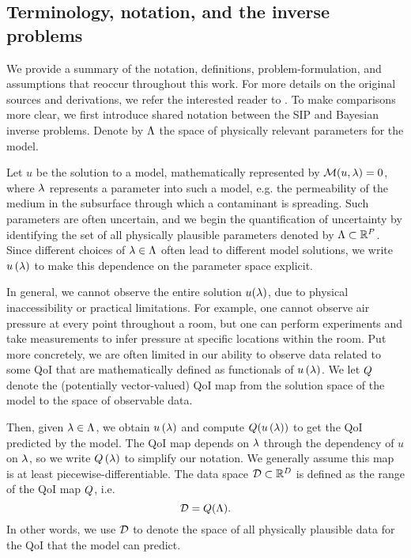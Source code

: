 \subsection{Terminology, notation, and the inverse problems}
We provide a summary of the notation, definitions, problem-formulation, and assumptions that reoccur throughout this work.
For more details on the original sources and derivations,  we refer the interested reader to \cite{BES12, BE13, BET+14, BJW18, BWY20}.
To make comparisons more clear, we first introduce shared notation between the SIP and Bayesian inverse problems.
Denote by ${\Lambda}$ the space of physically relevant parameters for the model.

Let $u$ be the solution to a model, mathematically represented by $\mathcal{M}(u, \lambda) = 0$, where $\lambda$ represents a parameter into such a model, e.g. the permeability of the medium in the subsurface through which a contaminant is spreading.
Such parameters are often uncertain, and we begin the quantification of uncertainty by identifying the set of all physically plausible parameters denoted by ${\Lambda}\subset\mathbb{R}^P$.
Since different choices of $\lambda \in {\Lambda}$ often lead to different model solutions, we write $u\left ( \lambda \right )$ to make this dependence on the parameter space explicit.

In general, we cannot observe the entire solution $u(\lambda)$, due to physical inaccessibility or practical limitations.
For example, one cannot observe air pressure at every point throughout a room, but one can perform experiments and take measurements to infer pressure at specific locations within the room.
Put more concretely, we are often limited in our ability to observe data related to some QoI that are mathematically defined as functionals of $u\left ( \lambda \right )$.%
We let $Q$ denote the (potentially vector-valued) QoI map from the solution space of the model to the space of observable data.

Then, given $\lambda \in {\Lambda}$, we obtain $u\left ( \lambda \right )$ and compute $Q(u\left ( \lambda \right ))$ to get the QoI predicted by the model.
The QoI map depends on $\lambda$ through the dependency of $u$ on $\lambda$, so we write $Q\left ( \lambda \right )$ to simplify our notation.
We generally assume this map is at least piecewise-differentiable.
The data space $\mathcal{D} \subset \mathbb{R}^D$ is defined as the range of the QoI map $Q$, i.e.
\[
\mathcal{D} = Q({\Lambda}).
\]
In other words, we use $\mathcal{D}$ to denote the space of all physically plausible data for the QoI that the model can predict.


